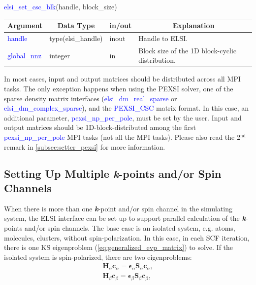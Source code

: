\documentclass{report}
\begin{document}
\begin{labeling}{\hspace{6cm}}
\item [\hspace{0.3cm} \textcolor{blue}{elsi\_set\_csc\_blk}(handle, block\_size)]
\end{labeling}

\begin{tabular}[]{|p{30mm}|p{30mm}|p{15mm}|p{90mm}|}
\hline
\multicolumn{1}{|c|}{\textbf{Argument}} & \multicolumn{1}{c|}{\textbf{Data Type}} & \multicolumn{1}{c|}{\textbf{in/out}} & \multicolumn{1}{c|}{\textbf{Explanation}}\\
\hline
\textcolor{blue}{handle}       & type(elsi\_handle) & inout & Handle to ELSI.\\
\hline
\textcolor{blue}{global\_nnz}  & integer            & in    & Block size of the 1D block-cyclic distribution.\\
\hline
\end{tabular}

\bigskip
In most cases, input and output matrices should be distributed across all MPI tasks.  The only exception happens when using the PEXSI solver, one of the sparse density matrix interfaces (\textcolor{blue}{elsi\_dm\_real\_sparse} or \textcolor{blue}{elsi\_dm\_complex\_sparse}), and the \textcolor{blue}{PEXSI\_CSC} matrix format.  In this case, an additional parameter, \textcolor{blue}{pexsi\_np\_per\_pole}, must be set by the user.  Input and output matrices should be 1D-block-distributed among the first \textcolor{blue}{pexsi\_np\_per\_pole} MPI tasks (not all the MPI tasks).  Please also read the 2$^\text{nd}$ remark in \ref{subsec:setter_pexsi} for more information.\\

\subsection{Setting Up Multiple \textbf{\textit{k}}-points and/or Spin Channels}
\label{subsec:setup_kpt}
When there is more than one \textbf{\textit{k}}-point and/or spin channel in the simulating system, the ELSI interface can be set up to support parallel calculation of the \textbf{\textit{k}}-points and/or spin channels.  The base case is an isolated system, e.g. atoms, molecules, clusters, without spin-polarization.  In this case, in each SCF iteration, there is one KS eigenproblem (\ref{eq:generalized_evp_matrix}) to solve.  If the isolated system is spin-polarized, there are two eigenproblems:\\
\begin{equation}
\label{eq:spin_evp}
\begin{split}
\boldsymbol{H}_\alpha \boldsymbol{c}_\alpha = \boldsymbol{\epsilon}_\alpha \boldsymbol{S}_\alpha \boldsymbol{c}_\alpha , \\
\boldsymbol{H}_\beta \boldsymbol{c}_\beta = \boldsymbol{\epsilon}_\beta \boldsymbol{S}_\beta \boldsymbol{c}_\beta ,
\end{split}
\end{equation}
\end{document}
